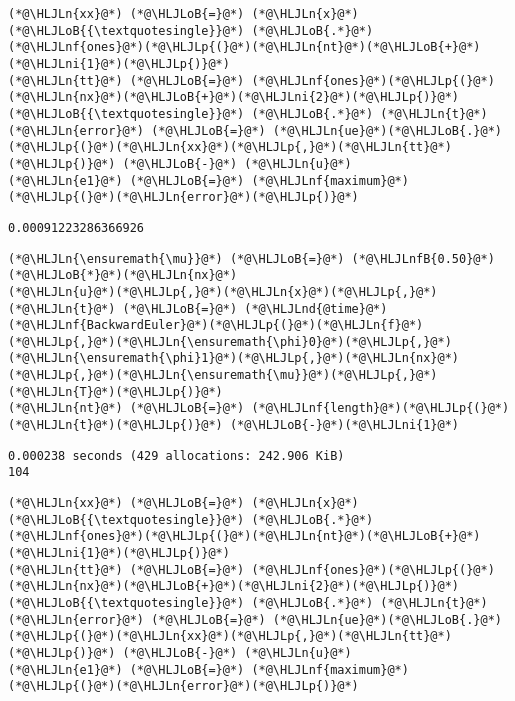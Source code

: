 \documentclass[12pt,a4paper]{article}
\newcommand{\HLJLn}[1]{#1}
\newcommand{\HLJLnd}[1]{\textcolor[RGB]{214,102,97}{#1}}
\newcommand{\HLJLnf}[1]{\textcolor[RGB]{66,102,213}{#1}}
\newcommand{\HLJLnfB}[1]{\textcolor[RGB]{59,151,46}{#1}}
\newcommand{\HLJLni}[1]{\textcolor[RGB]{59,151,46}{#1}}
\newcommand{\HLJLoB}[1]{\textcolor[RGB]{102,102,102}{\textbf{#1}}}
\newcommand{\HLJLp}[1]{#1}
\begin{document}
\begin{lstlisting}
(*@\HLJLn{xx}@*) (*@\HLJLoB{=}@*) (*@\HLJLn{x}@*)(*@\HLJLoB{{\textquotesingle}}@*) (*@\HLJLoB{.*}@*) (*@\HLJLnf{ones}@*)(*@\HLJLp{(}@*)(*@\HLJLn{nt}@*)(*@\HLJLoB{+}@*)(*@\HLJLni{1}@*)(*@\HLJLp{)}@*)
(*@\HLJLn{tt}@*) (*@\HLJLoB{=}@*) (*@\HLJLnf{ones}@*)(*@\HLJLp{(}@*)(*@\HLJLn{nx}@*)(*@\HLJLoB{+}@*)(*@\HLJLni{2}@*)(*@\HLJLp{)}@*)(*@\HLJLoB{{\textquotesingle}}@*) (*@\HLJLoB{.*}@*) (*@\HLJLn{t}@*)
(*@\HLJLn{error}@*) (*@\HLJLoB{=}@*) (*@\HLJLn{ue}@*)(*@\HLJLoB{.}@*)(*@\HLJLp{(}@*)(*@\HLJLn{xx}@*)(*@\HLJLp{,}@*)(*@\HLJLn{tt}@*)(*@\HLJLp{)}@*) (*@\HLJLoB{-}@*) (*@\HLJLn{u}@*) 
(*@\HLJLn{e1}@*) (*@\HLJLoB{=}@*) (*@\HLJLnf{maximum}@*)(*@\HLJLp{(}@*)(*@\HLJLn{error}@*)(*@\HLJLp{)}@*)
\end{lstlisting}

\begin{lstlisting}
0.00091223286366926
\end{lstlisting}


\begin{lstlisting}
(*@\HLJLn{\ensuremath{\mu}}@*) (*@\HLJLoB{=}@*) (*@\HLJLnfB{0.50}@*)(*@\HLJLoB{*}@*)(*@\HLJLn{nx}@*)
(*@\HLJLn{u}@*)(*@\HLJLp{,}@*)(*@\HLJLn{x}@*)(*@\HLJLp{,}@*)(*@\HLJLn{t}@*) (*@\HLJLoB{=}@*) (*@\HLJLnd{@time}@*) (*@\HLJLnf{BackwardEuler}@*)(*@\HLJLp{(}@*)(*@\HLJLn{f}@*)(*@\HLJLp{,}@*)(*@\HLJLn{\ensuremath{\phi}0}@*)(*@\HLJLp{,}@*)(*@\HLJLn{\ensuremath{\phi}1}@*)(*@\HLJLp{,}@*)(*@\HLJLn{nx}@*)(*@\HLJLp{,}@*)(*@\HLJLn{\ensuremath{\mu}}@*)(*@\HLJLp{,}@*)(*@\HLJLn{T}@*)(*@\HLJLp{)}@*)
(*@\HLJLn{nt}@*) (*@\HLJLoB{=}@*) (*@\HLJLnf{length}@*)(*@\HLJLp{(}@*)(*@\HLJLn{t}@*)(*@\HLJLp{)}@*) (*@\HLJLoB{-}@*)(*@\HLJLni{1}@*)
\end{lstlisting}

\begin{lstlisting}
0.000238 seconds (429 allocations: 242.906 KiB)
104
\end{lstlisting}


\begin{lstlisting}
(*@\HLJLn{xx}@*) (*@\HLJLoB{=}@*) (*@\HLJLn{x}@*)(*@\HLJLoB{{\textquotesingle}}@*) (*@\HLJLoB{.*}@*) (*@\HLJLnf{ones}@*)(*@\HLJLp{(}@*)(*@\HLJLn{nt}@*)(*@\HLJLoB{+}@*)(*@\HLJLni{1}@*)(*@\HLJLp{)}@*)
(*@\HLJLn{tt}@*) (*@\HLJLoB{=}@*) (*@\HLJLnf{ones}@*)(*@\HLJLp{(}@*)(*@\HLJLn{nx}@*)(*@\HLJLoB{+}@*)(*@\HLJLni{2}@*)(*@\HLJLp{)}@*)(*@\HLJLoB{{\textquotesingle}}@*) (*@\HLJLoB{.*}@*) (*@\HLJLn{t}@*)
(*@\HLJLn{error}@*) (*@\HLJLoB{=}@*) (*@\HLJLn{ue}@*)(*@\HLJLoB{.}@*)(*@\HLJLp{(}@*)(*@\HLJLn{xx}@*)(*@\HLJLp{,}@*)(*@\HLJLn{tt}@*)(*@\HLJLp{)}@*) (*@\HLJLoB{-}@*) (*@\HLJLn{u}@*) 
(*@\HLJLn{e1}@*) (*@\HLJLoB{=}@*) (*@\HLJLnf{maximum}@*)(*@\HLJLp{(}@*)(*@\HLJLn{error}@*)(*@\HLJLp{)}@*)
\end{lstlisting}
\end{document}
